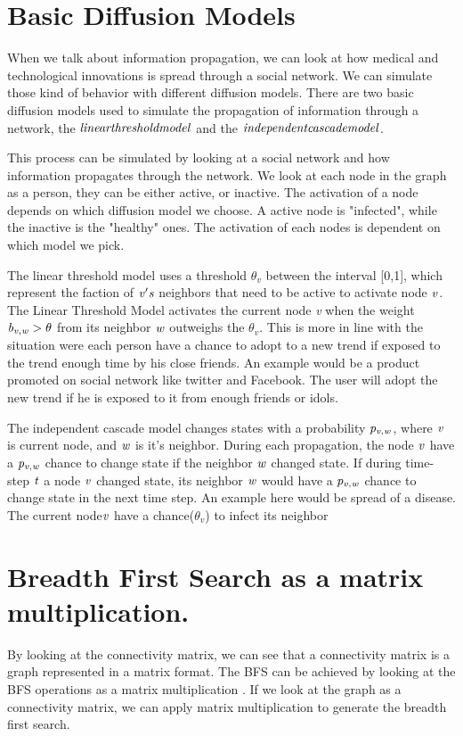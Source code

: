 \section{Basic Diffusion Models}
When we talk about information propagation, we can look at how medical and technological innovations is spread through a social network. We can simulate those kind of behavior with different diffusion models. There are two basic diffusion models used to simulate the propagation of information through a network\cite{MaximizeSpread2003}, the {$\it linear threshold model$} and the $\it{ independent cascade model}$\cite{MaximizeSpread2003}.

This process can be simulated by looking at a social network and how information propagates through the network. We look at each node in the graph as a person, they can be either active, or inactive. The activation of a node depends on which diffusion model we choose. A active node is "infected", while the inactive is the "healthy" ones. The activation of each nodes is dependent on which model we pick.

The linear threshold model uses a threshold $\theta_v$ between the interval [0,1], which represent the faction of $\it{v}'s$ neighbors that need to be active to activate node $\it{v}$. The Linear Threshold Model activates the current node {\it v} when the weight ${\it b_{v,w}} > \theta$ from its neighbor $\it{w}$ outweighs the $\theta_v$. This is more in line with the situation were each person have a chance to adopt to a new trend if exposed to the trend enough time by his close friends. An example would be a product promoted on social network like twitter and Facebook. The user will adopt the new trend if he is exposed to it from enough friends or idols. 

The independent cascade model changes states with a probability $\it{p_{v, w}}$, where $\it{ v }$ is current node, and $\it{w}$ is it's neighbor. During each propagation, the node $\it{v}$ have a  $\it{p_{v, w}}$ chance to change state if the neighbor $\it{w}$ changed state. If during time-step $\it{t}$ a node $\it{v}$ changed state, its neighbor $\it{w}$ would have a $\it{p_{v, w}}$ chance to change state in the next time step. An example here would be spread of a disease. The current node$\it{v}$ have a chance($\theta_v$) to infect its neighbor

\section{Breadth First Search as a matrix multiplication.}
By looking at the 	connectivity matrix, we can see that a connectivity matrix is a graph represented in a matrix format. The BFS can be achieved by looking at the BFS operations as a matrix multiplication \cite{algoToMath}. If we look at the graph as a connectivity matrix, we can apply matrix multiplication to generate the breadth first search. 

